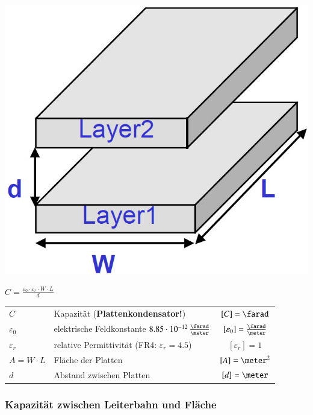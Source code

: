 \begin{minipage}[c]{0.28\columnwidth}
    \includegraphics[width=\columnwidth]{images/leitungen_kapazitaet.jpg}
\end{minipage}
\hfill
\begin{minipage}[c]{0.65\columnwidth}
    $ \boxed{C = \frac{\varepsilon_0 \cdot \varepsilon_r \cdot W \cdot L}{d}} $
\end{minipage}

\begin{tabular}{llc}
    $C$             & Kapazität (\textbf{Plattenkondensator!})                                  & $[C] = \farad$ \\
    $\varepsilon_0$ & elektrische Feldkonstante $8.85 \cdot 10^{-12} \, \frac{\farad}{\meter}$  & $[\varepsilon_0] = \frac{\farad}{\meter}$ \\
    $\varepsilon_r$ & relative Permittivität (FR4: $\varepsilon_r= 4.5$)                        & $[\varepsilon_r] = 1$ \\
    $A = W \cdot L$ & Fläche der Platten                                                        & $[A] = \meter^2$ \\
    $d$             & Abstand zwischen Platten                                                  & $[d] = \meter$
\end{tabular}


\subsubsection{Kapazität zwischen Leiterbahn und Fläche}

